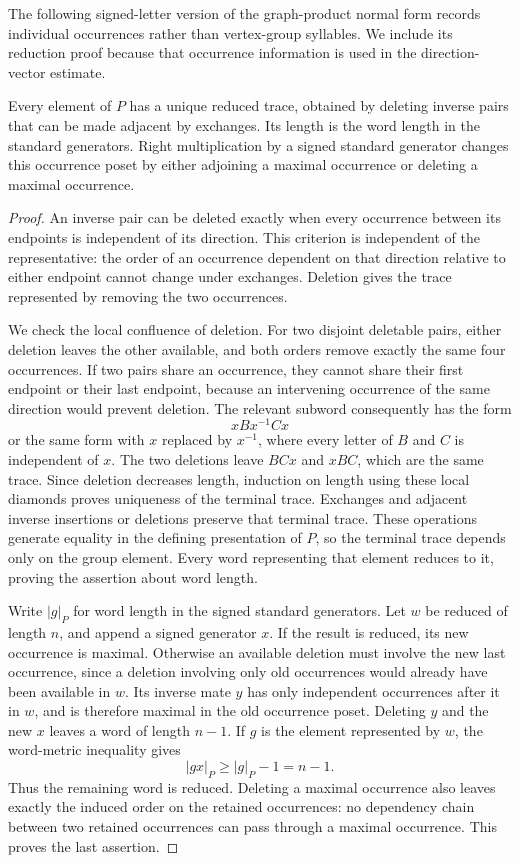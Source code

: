 The following signed-letter version of the graph-product normal form
\cite[Theorem~3.9]{Green1990} records individual occurrences rather than
vertex-group syllables. We include its reduction proof because that
occurrence information is used in the direction-vector estimate.

\begin{lemma}\label{lem:trace-normal-form}
Every element of $P$ has a unique reduced trace, obtained by deleting
inverse pairs that can be made adjacent by exchanges.  Its length is
the word length in the standard generators.  Right multiplication by
a signed standard generator changes this occurrence poset by either
adjoining a maximal occurrence or deleting a maximal occurrence.
\end{lemma}

\begin{proof}
An inverse pair can be deleted exactly when every occurrence between
its endpoints is independent of its direction.  This criterion is
independent of the representative: the order of an occurrence
dependent on that direction relative to either endpoint cannot change
under exchanges.  Deletion gives the trace represented by removing the
two occurrences.

We check the local confluence of deletion.  For two disjoint deletable
pairs, either deletion leaves the other available, and both orders
remove exactly the same four occurrences.  If two pairs share an
occurrence, they cannot share their first endpoint or their last
endpoint, because an intervening occurrence of the same direction
would prevent deletion.  The relevant subword consequently has the
form
\[
 x B x^{-1} C x
\]
or the same form with $x$ replaced by $x^{-1}$, where every letter of
$B$ and $C$ is independent of $x$.  The two deletions leave $BCx$ and
$xBC$, which are the same trace.  Since deletion decreases length,
induction on length using these local diamonds proves uniqueness of
the terminal trace.  Exchanges and adjacent inverse insertions or
deletions preserve that terminal trace.  These operations generate
equality in the defining presentation of $P$, so the terminal trace
depends only on the group element.  Every word representing that
element reduces to it, proving the assertion about word length.

Write $|g|_P$ for word length in the signed standard generators.
Let $w$ be reduced of length $n$, and append a signed generator $x$.
If the result is reduced, its new occurrence is maximal.  Otherwise
an available deletion must involve the new last occurrence, since a
deletion involving only old occurrences would already have been
available in $w$.  Its inverse mate $y$ has only independent
occurrences after it in $w$, and is therefore maximal in the old
occurrence poset.  Deleting $y$ and the new $x$ leaves a word of length
$n-1$.  If $g$ is the element represented by $w$, the word-metric
inequality gives
\[
 |gx|_P\geq |g|_P-1=n-1.
\]
Thus the remaining word is reduced.  Deleting a maximal occurrence
also leaves exactly the induced order on the retained occurrences:
no dependency chain between two retained occurrences can pass through
a maximal occurrence.  This proves the last assertion.
\end{proof}

